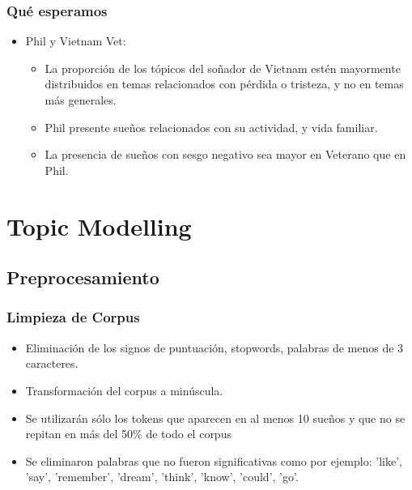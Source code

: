 \documentclass{beamer}
\begin{document}
\begin{frame}
\frametitle{Qué esperamos}
\begin{itemize}
[triangle]
	\item Phil y Vietnam Vet:
	\begin{itemize}
	[circle]
	    \item La proporción de los tópicos del soñador de Vietnam estén mayormente distribuidos en temas relacionados con pérdida o tristeza, y no en temas más generales.
	    \item Phil presente sueños relacionados con su actividad, y vida familiar.
	    \item La presencia de sueños con sesgo negativo sea mayor en Veterano que en Phil.
	    
	 \end{itemize}
\end{itemize}

\end{frame}

\section{Topic Modelling}

\subsection{Preprocesamiento}
\begin{frame}
\frametitle{Limpieza de Corpus}
\begin{itemize}
[triangle]
	\item Eliminación de los signos de puntuación, stopwords, palabras de menos de 3 caracteres.
	\item Transformación del corpus a minúscula.
	\item Se utilizarán sólo los tokens que aparecen en al menos 10 sueños y que no se repitan en más del 50\% de todo el corpus
	\item Se eliminaron palabras que no fueron significativas como por ejemplo: 'like', 'say', 'remember', 'dream', 'think', 'know', 'could', 'go’.
\end{itemize}

\end{frame}
\end{document}
